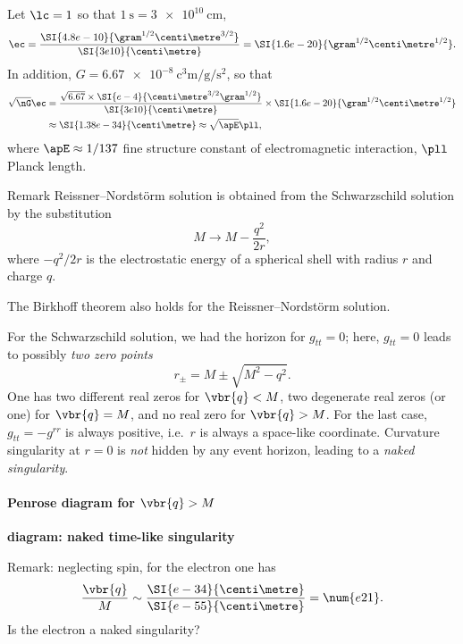 Let $\lc = 1$ so that $\SI{1}{\second} = \SI{3e10}{\centi\metre}$,
\begin{equation}
\ec = \frac{\SI{4.8e-10}{\gram^{1/2}\centi\metre^{3/2}}}%
{\SI{3e10}{\centi\metre}} = \SI{1.6e-20}{\gram^{1/2}\centi\metre^{1/2}}.
\end{equation}
In addition, $G = \SI{6.67e-8}%
{\cubic\centi\metre\per\gram\per\square\second}$, so that
\begin{align}
\sqrt{\nG}\ec &= \frac{\sqrt{6.67}\times
\SI{e-4}{\centi\metre^{3/2}\gram^{1/2}}}{\SI{3e10}{\centi\metre}}\times
\SI{1.6e-20}{\gram^{1/2}\centi\metre^{1/2}} \nonumber \\
&\approx \SI{1.38e-34}{\centi\metre} \approx \sqrt{\apE}\pll,
\end{align}
where $\apE \approx 1/137$ fine structure constant of electromagnetic
interaction, $\pll$ Planck length.


\begin{namedrem}{Remark}
Reissner--Nordstörm solution is obtained from the Schwarzschild
solution by the substitution
\begin{equation}
M \to M - \frac{q^2}{2r},
\end{equation}
where $-q^2/2r$ is the electrostatic energy of a spherical shell with radius
$r$ and charge $q$.
\end{namedrem} %

The Birkhoff theorem also holds for the Reissner--Nordstörm solution.

For the Schwarzschild solution, we had the horizon for $g_{tt} = 0$; here,
$g_{tt} = 0$ leads to possibly \emph{two zero points}
\begin{equation}
r_\pm = M\pm\sqrt{M^2 - q^2}.
\end{equation}
One has two different real zeros for $\vbr{q} < M$, two degenerate real zeros
(or one) for $\vbr{q} = M$, and no real zero for $\vbr{q} > M$. For
the last case, $g_{tt} = -g^{rr}$ is always positive, i.e.\ $r$ is always a
space-like coordinate. Curvature singularity at $r = 0$ is \emph{not} hidden
by any event horizon, leading to a \emph{naked singularity}.

\paragraph{Penrose diagram for $\vbr{q} > M$}

\textbf{diagram: naked time-like singularity}

Remark: neglecting spin, for the electron one has
\begin{equation}
\frac{\vbr{q}}{M} \sim \frac{\SI{e-34}{\centi\metre}}{\SI{e-55}{\centi\metre}}
= \num{e21}.
\end{equation}
Is the electron a naked singularity?

